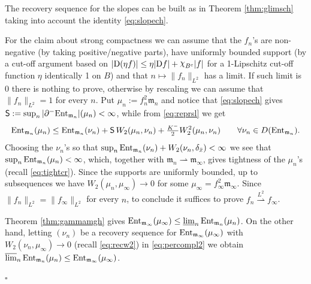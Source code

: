 \documentclass[11pt]{article}
\numberwithin{equation}{section}
\newenvironment{idea}{\removelastskip\par\medskip   %
\noindent{\em Idea of the proof} \rm}{\penalty-20\null\hfill$\square$\par\medbreak}
\newcommand{\mm}{{\mathfrak m}}
\newcommand{\entm}[1]{{\rm Ent}_{#1}}
\newcommand{\D}{{\rm D}}
\newcommand{\lims}{\varlimsup}
\newcommand{\limi}{\varliminf}
\newcommand{\weakto}{\rightharpoonup}
\newcommand{\nchi}{{\raise.3ex\hbox{$\chi$}}}
\begin{document}
\begin{idea} The recovery sequence for the slopes can be built as in Theorem \ref{thm:glimsch} taking into account the identity \eqref{eq:slopech}.

For the claim about strong compactness  we can assume that the $f_n$'s are non-negative (by taking positive/negative parts),  have uniformly bounded support (by a cut-off argument based on $|\D(\eta f)|\leq \eta|\D f|+\nchi_{B^c}|f|$ for a 1-Lipschitz cut-off function $\eta$ identically 1 on $B$) and that $n\mapsto \|f_n\|_{L^2}$ has a limit. If such limit is 0 there is nothing to prove, otherwise by rescaling we can assume that $\|f_n\|_{L^2}=1$ for every $n$. Put $\mu_n:=f_n^2\mm_n$ and notice that \eqref{eq:slopech} gives ${\sf S}:=\sup_n|\partial^-\entm{\mm_n}|(\mu_n)<\infty$, while from \eqref{eq:reprsl} we get 
\begin{equation}
\label{eq:percompl2}
\entm{\mm_n}(\mu_n)\leq \entm{\mm_n}(\nu_n)+{\sf S}\,W_2(\mu_n,\nu_n)+\tfrac{K^-}2W_2^2(\mu_n,\nu_n)\qquad\forall\nu_n\in D(\entm{\mm_n}).
\end{equation}
Choosing the $\nu_n$'s so that $\sup_n\entm{\mm_n}(\nu_n)+W_2(\nu_n,\delta_{\bar x})<\infty$ we see that $\sup_n\entm{\mm_n}(\mu_n)<\infty$, which, together with $\mm_n\weakto\mm_\infty$, gives tightness of the $\mu_n$'s (recall \eqref{eq:tightcr}). Since the supports are uniformly bounded, up to subsequences we have  $W_2(\mu_n,\mu_\infty)\to 0$ for some $\mu_\infty=f^2_\infty\mm_\infty$. Since $\|f_n\|_{L^2}=\|f_\infty\|_{L^2}$ for every $n$, to conclude it suffices to  prove $f_n\stackrel{L^2}\weakto f_\infty$. 

Theorem \ref{thm:gammamgh} gives $\entm{\mm_\infty}(\mu_\infty)\leq\limi_n\entm{\mm_n}(\mu_n)$. On the other hand, letting $(\nu_n)$ be a recovery sequence for $ \entm{\mm_\infty}(\mu_\infty)$ with  $W_2(\nu_n,\mu_\infty)\to0$ (recall \eqref{eq:recw2}) in \eqref{eq:percompl2} we obtain $\lims_n\entm{\mm_n}(\mu_n)\leq \entm{\mm_\infty}(\mu_\infty)$. 


\end{idea}
\end{document}
